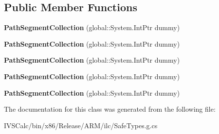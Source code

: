 \subsection*{Public Member Functions}
\begin{DoxyCompactItemize}
\item 
\mbox{\label{class_windows_1_1_u_i_1_1_xaml_1_1_media_1_1_path_segment_collection_af541232e6e7f3faa606991227144a4d2}} 
{\bfseries Path\+Segment\+Collection} (global\+::\+System.\+Int\+Ptr dummy)
\item 
\mbox{\label{class_windows_1_1_u_i_1_1_xaml_1_1_media_1_1_path_segment_collection_af541232e6e7f3faa606991227144a4d2}} 
{\bfseries Path\+Segment\+Collection} (global\+::\+System.\+Int\+Ptr dummy)
\item 
\mbox{\label{class_windows_1_1_u_i_1_1_xaml_1_1_media_1_1_path_segment_collection_af541232e6e7f3faa606991227144a4d2}} 
{\bfseries Path\+Segment\+Collection} (global\+::\+System.\+Int\+Ptr dummy)
\item 
\mbox{\label{class_windows_1_1_u_i_1_1_xaml_1_1_media_1_1_path_segment_collection_af541232e6e7f3faa606991227144a4d2}} 
{\bfseries Path\+Segment\+Collection} (global\+::\+System.\+Int\+Ptr dummy)
\item 
\mbox{\label{class_windows_1_1_u_i_1_1_xaml_1_1_media_1_1_path_segment_collection_af541232e6e7f3faa606991227144a4d2}} 
{\bfseries Path\+Segment\+Collection} (global\+::\+System.\+Int\+Ptr dummy)
\end{DoxyCompactItemize}


The documentation for this class was generated from the following file\+:\begin{DoxyCompactItemize}
\item 
I\+V\+S\+Calc/bin/x86/\+Release/\+A\+R\+M/ilc/Safe\+Types.\+g.\+cs\end{DoxyCompactItemize}
